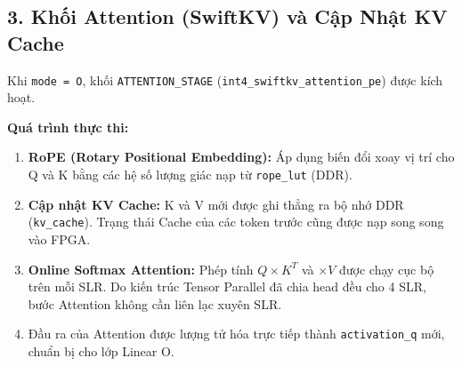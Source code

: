 \documentclass[12pt,a4paper]{article}
\begin{document}
\subsection{3. Khối Attention (SwiftKV) và Cập Nhật KV Cache}

Khi \texttt{mode = O}, khối \texttt{ATTENTION\_STAGE} (\texttt{int4\_swiftkv\_attention\_pe}) được kích hoạt.

\textbf{Quá trình thực thi:}
\begin{enumerate}
    \item \textbf{RoPE (Rotary Positional Embedding):} Áp dụng biến đổi xoay vị trí cho Q và K bằng các hệ số lượng giác nạp từ \texttt{rope\_lut} (DDR).
    \item \textbf{Cập nhật KV Cache:} K và V mới được ghi thẳng ra bộ nhớ DDR (\texttt{kv\_cache}). Trạng thái Cache của các token trước cũng được nạp song song vào FPGA.
    \item \textbf{Online Softmax Attention:} Phép tính $Q \times K^T$ và $\times V$ được chạy cục bộ trên mỗi SLR. Do kiến trúc Tensor Parallel đã chia head đều cho 4 SLR, bước Attention không cần liên lạc xuyên SLR.
    \item Đầu ra của Attention được lượng tử hóa trực tiếp thành \texttt{activation\_q} mới, chuẩn bị cho lớp Linear O.
\end{enumerate}
\end{document}
